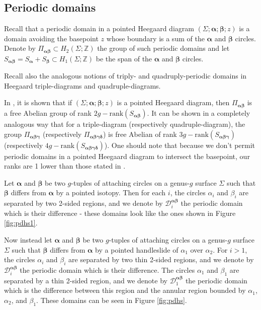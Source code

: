 \documentclass[11pt]{article}
\theoremstyle{plain} \newtheorem{thm}{Theorem}[subsection]
\theoremstyle{plain} \newtheorem{cor}[thm]{Corollary}
\theoremstyle{plain} \newtheorem{prop}[thm]{Proposition}
\theoremstyle{plain} \newtheorem{conj}[thm]{Conjecture}
\theoremstyle{plain} \newtheorem{lem}[thm]{Lemma}
\theoremstyle{definition} \newtheorem{df}[thm]{Definition}
\theoremstyle{remark} \newtheorem{rmk}[thm]{Remark}
\theoremstyle{remark} \newtheorem{obs}[thm]{Observation}
\newcommand{\DD}{\mathcal{D}}
\newcommand{\Sa}{S_{\ba}}
\newcommand{\Dab}[1]{\DD^{\ba\bb}_{#1}}
\newcommand{\Sb}{S_{\bb}}
\newcommand{\Pab}{\Pi_{\ba\bb}}
\newcommand{\Sab}{S_{\ba\bb}}
\newcommand{\Pabg}{\Pi_{\ba\bb\bg}}
\newcommand{\Sabg}{S_{\ba\bb\bg}}
\newcommand{\Pabgd}{\Pi_{\ba\bb\bg\bd}}
\newcommand{\Sabgd}{S_{\ba\bb\bg\bd}}
\newcommand{\ba}{\boldsymbol{\alpha}}
\newcommand{\bb}{\boldsymbol{\beta}}
\newcommand{\bg}{\boldsymbol{\gamma}}
\newcommand{\bd}{\boldsymbol{\delta}}
\begin{document}
\subsection{Periodic domains}\label{sec:pd}

Recall that a periodic domain in a pointed Heegaard diagram $\left(\Sigma; \ba; \bb; z\right)$ is a domain avoiding the basepoint $z$ whose boundary is a sum of the $\ba$ and $\bb$ circles.  Denote by $\Pab \subset H_{2}\left(\Sigma; \mathbb{Z}\right)$ the group of such periodic domains and let $\Sab = \Sa + \Sb \subset H_{1}\left(\Sigma; \mathbb{Z}\right)$ be the span of the $\ba$ and $\bb$ circles.

Recall also the analogous notions of triply- and quadruply-periodic domains in Heegaard triple-diagrams and quadruple-diagrams.

In \cite{cmoz:thin}, it is shown that if $\left(\Sigma; \ba; \bb; z\right)$ is a pointed Heegaard diagram, then $\Pab$ is a free Abelian group of rank $2g - \text{rank}(\Sab)$.  It can be shown in a completely analogous way that for a triple-diagram (respectively quadruple-diagram), the group $\Pabg$ (respectively $\Pabgd$) is free Abelian of rank $3g - \text{rank}(\Sabg)$ (respectively $4g - \text{rank}(\Sabgd)$).  One should note that because we don't permit periodic domains in a pointed Heegaard diagram to intersect the basepoint, our ranks are 1 lower than those stated in \cite{cmoz:thin}.

Let $\ba$ and $\bb$ be two $g$-tuples of attaching circles on a genus-$g$ surface $\Sigma$ such that $\bb$ differs from $\ba$ by a pointed isotopy.  Then for each $i$, the circles $\alpha_{i}$ and $\beta_{i}$ are separated by two 2-sided regions, and we denote by $\Dab{i}$ the periodic domain which is their difference - these domains look like the ones shown in Figure \ref{fig:pdhs1}.

Now instead let $\ba$ and $\bb$ be two $g$-tuples of attaching circles on a genus-$g$ surface $\Sigma$ such that $\bb$ differs from $\ba$ by a pointed handleslide of $\alpha_{1}$ over $\alpha_{2}$.  For $i > 1$, the circles $\alpha_{i}$ and $\beta_{i}$ are separated by two thin 2-sided regions, and we denote by $\Dab{i}$ the periodic domain which is their difference.  The circles $\alpha_{1}$ and $\beta_{1}$ are separated by a thin 2-sided region, and we denote by $\Dab{1}$ the periodic domain which is the difference between this region and the annular region bounded by $\alpha_{1}$, $\alpha_{2}$, and $\beta_{1}$.  These domains can be seen in Figure \ref{fig:pdhs}.
\end{document}
